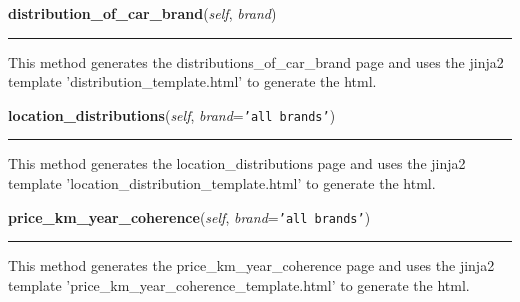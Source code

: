 \hspace{.8\funcindent}\begin{boxedminipage}{\funcwidth}

    \raggedright \textbf{distribution\_of\_car\_brand}(\textit{self}, \textit{brand})

    \vspace{-1.5ex}

    \rule{\textwidth}{0.5\fboxrule}
\setlength{\parskip}{2ex}
    This method generates the distributions\_of\_car\_brand page and uses 
    the jinja2 template 'distribution\_template.html' to generate the html.

\setlength{\parskip}{1ex}
    \end{boxedminipage}

    \label{BilbasenDataMining:main:MiningBilbasen:location_distributions}

    \vspace{0.5ex}

\hspace{.8\funcindent}\begin{boxedminipage}{\funcwidth}

    \raggedright \textbf{location\_distributions}(\textit{self}, \textit{brand}={\tt \texttt{'}\texttt{all brands}\texttt{'}})

    \vspace{-1.5ex}

    \rule{\textwidth}{0.5\fboxrule}
\setlength{\parskip}{2ex}
    This method generates the location\_distributions page and uses the 
    jinja2 template 'location\_distribution\_template.html' to generate the
    html.

\setlength{\parskip}{1ex}
    \end{boxedminipage}

    \label{BilbasenDataMining:main:MiningBilbasen:price_km_year_coherence}

    \vspace{0.5ex}

\hspace{.8\funcindent}\begin{boxedminipage}{\funcwidth}

    \raggedright \textbf{price\_km\_year\_coherence}(\textit{self}, \textit{brand}={\tt \texttt{'}\texttt{all brands}\texttt{'}})

    \vspace{-1.5ex}

    \rule{\textwidth}{0.5\fboxrule}
\setlength{\parskip}{2ex}
    This method generates the price\_km\_year\_coherence page and uses the 
    jinja2 template 'price\_km\_year\_coherence\_template.html' to generate
    the html.

\setlength{\parskip}{1ex}
    \end{boxedminipage}

